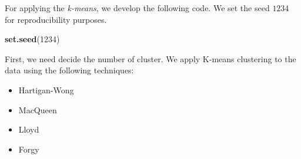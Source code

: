 \documentclass[11pt,]{article}
\newenvironment{Shaded}{\begin{snugshade}}{\end{snugshade}}
\newcommand{\KeywordTok}[1]{\textcolor[rgb]{0.13,0.29,0.53}{\textbf{#1}}}
\newcommand{\DecValTok}[1]{\textcolor[rgb]{0.00,0.00,0.81}{#1}}
\newcommand{\NormalTok}[1]{#1}
\begin{document}
For applying the \emph{k-means}, we develop the following code. We set
the seed \(1234\) for reproducibility purposes.

\begin{Shaded}
\begin{Highlighting}[]
\KeywordTok{set.seed}\NormalTok{(}\DecValTok{1234}\NormalTok{)}
\end{Highlighting}
\end{Shaded}

First, we need decide the number of cluster. We apply K-means clustering
to the data using the following techniques:

\begin{itemize}
\item
  Hartigan-Wong
\item
  MacQueen
\item
  Lloyd
\item
  Forgy
\end{itemize}
\end{document}
